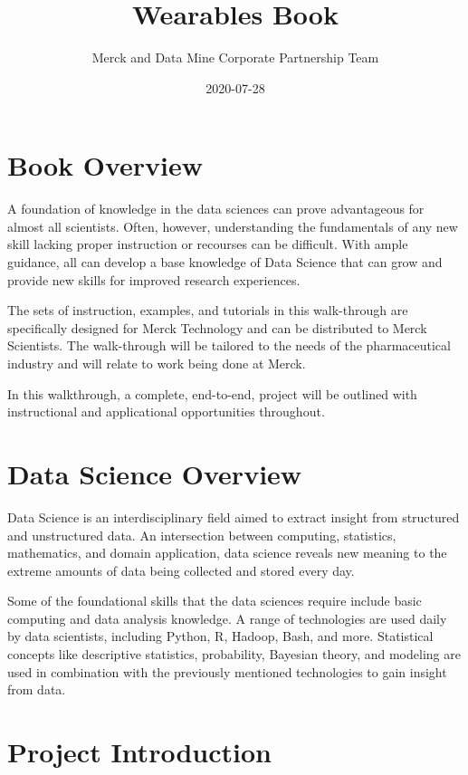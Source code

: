 \documentclass[]{book}
\title{Wearables Book}
\author{Merck and Data Mine Corporate Partnership Team}
\date{2020-07-28}
\begin{document}
\maketitle

{
\setcounter{tocdepth}{1}
\tableofcontents
}
\chapter{Book Overview}\label{book-overview}

A foundation of knowledge in the data sciences can prove advantageous
for almost all scientists. Often, however, understanding the
fundamentals of any new skill lacking proper instruction or recourses
can be difficult. With ample guidance, all can develop a base knowledge
of Data Science that can grow and provide new skills for improved
research experiences.

The sets of instruction, examples, and tutorials in this walk-through
are specifically designed for Merck Technology and can be distributed to
Merck Scientists. The walk-through will be tailored to the needs of the
pharmaceutical industry and will relate to work being done at Merck.

In this walkthrough, a complete, end-to-end, project will be outlined
with instructional and applicational opportunities throughout.

\chapter{Data Science Overview}\label{intro}

Data Science is an interdisciplinary field aimed to extract insight from
structured and unstructured data. An intersection between computing,
statistics, mathematics, and domain application, data science reveals
new meaning to the extreme amounts of data being collected and stored
every day.

Some of the foundational skills that the data sciences require include
basic computing and data analysis knowledge. A range of technologies are
used daily by data scientists, including Python, R, Hadoop, Bash, and
more. Statistical concepts like descriptive statistics, probability,
Bayesian theory, and modeling are used in combination with the
previously mentioned technologies to gain insight from data.

\chapter{Project Introduction}\label{project-introduction}
\end{document}
